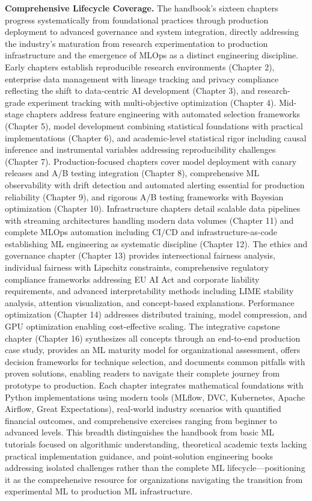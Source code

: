 \documentclass[11pt]{book}
\begin{document}
\textbf{Comprehensive Lifecycle Coverage.} The handbook's sixteen chapters progress systematically from foundational practices through production deployment to advanced governance and system integration, directly addressing the industry's maturation from research experimentation to production infrastructure and the emergence of MLOps as a distinct engineering discipline. Early chapters establish reproducible research environments (Chapter 2), enterprise data management with lineage tracking and privacy compliance reflecting the shift to data-centric AI development (Chapter 3), and research-grade experiment tracking with multi-objective optimization (Chapter 4). Mid-stage chapters address feature engineering with automated selection frameworks (Chapter 5), model development combining statistical foundations with practical implementations (Chapter 6), and academic-level statistical rigor including causal inference and instrumental variables addressing reproducibility challenges (Chapter 7). Production-focused chapters cover model deployment with canary releases and A/B testing integration (Chapter 8), comprehensive ML observability with drift detection and automated alerting essential for production reliability (Chapter 9), and rigorous A/B testing frameworks with Bayesian optimization (Chapter 10). Infrastructure chapters detail scalable data pipelines with streaming architectures handling modern data volumes (Chapter 11) and complete MLOps automation including CI/CD and infrastructure-as-code establishing ML engineering as systematic discipline (Chapter 12). The ethics and governance chapter (Chapter 13) provides intersectional fairness analysis, individual fairness with Lipschitz constraints, comprehensive regulatory compliance frameworks addressing EU AI Act and corporate liability requirements, and advanced interpretability methods including LIME stability analysis, attention visualization, and concept-based explanations. Performance optimization (Chapter 14) addresses distributed training, model compression, and GPU optimization enabling cost-effective scaling. The integrative capstone chapter (Chapter 16) synthesizes all concepts through an end-to-end production case study, provides an ML maturity model for organizational assessment, offers decision frameworks for technique selection, and documents common pitfalls with proven solutions, enabling readers to navigate their complete journey from prototype to production. Each chapter integrates mathematical foundations with Python implementations using modern tools (MLflow, DVC, Kubernetes, Apache Airflow, Great Expectations), real-world industry scenarios with quantified financial outcomes, and comprehensive exercises ranging from beginner to advanced levels. This breadth distinguishes the handbook from basic ML tutorials focused on algorithmic understanding, theoretical academic texts lacking practical implementation guidance, and point-solution engineering books addressing isolated challenges rather than the complete ML lifecycle—positioning it as the comprehensive resource for organizations navigating the transition from experimental ML to production ML infrastructure.
\end{document}
